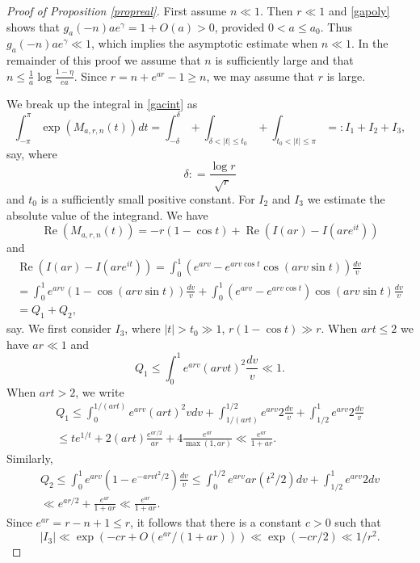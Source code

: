 \documentclass[11pt]{amsart}
\DeclareMathOperator{\re}{Re}
\begin{document}
\begin{proof}[Proof of Proposition \ref{propreal}]
First assume $n \ll 1$. Then $r\ll 1$ and \eqref{gapoly} shows that $g_a(-n) a e^\gamma = 1+O(a) >0$, provided $0<a\le a_0$. 
Thus $ g_a(-n) a e^\gamma \ll 1$, which implies the asymptotic estimate when $n\ll 1$. 
In the remainder of this proof we assume that $n$ is sufficiently large and that $n \le \frac{1}{a}\log \frac{1-\eta}{ea}$.
Since $r=n+e^{ar}-1 \ge n$, we may assume that $r$ is large. 

We break up the integral in \eqref{gacint} as 
$$
\int_{-\pi}^\pi  \exp\left(M_{a,r,n}(t)\right)dt = \int_{-\delta}^\delta + \int_{\delta<|t|\le t_0} +\int_{t_0<|t| \le \pi} =: I_1+I_2+I_3,
$$
say, where 
$$
\delta: =\frac{\log r }{\sqrt{r}}
$$
and $t_0$ is a sufficiently small positive constant. 
For $I_2$ and $I_3$ we estimate the absolute value of the integrand. We have
$$
\re(M_{a,r,n}(t)) = -r(1-\cos t ) + \re(I(ar)-I(ar e^{it}))
$$
and
\begin{multline*}
 \re(I(ar)-I(ar e^{it}))  = \int_0^1 (e^{arv}-e^{arv \cos t }\cos(arv \sin t) ) \frac{dv}{v} \\
 =  \int_0^1 e^{arv}(1-\cos(arv \sin t) ) \frac{dv}{v} +  \int_0^1 (e^{arv}-e^{arv \cos t })\cos(arv \sin t) \frac{dv}{v}\\
=Q_1+Q_2,
\end{multline*}
say. We first consider $I_3$, where $|t|>t_0 \gg 1$, $r(1-\cos t) \gg r$. When $art \le 2$ we have $ar\ll 1$ and 
$$
Q_1 \le \int_0^{1} e^{arv}( a r v  t)^2  \frac{dv}{v} \ll 1.
$$ 
When $art > 2$, we write
\begin{multline*}
Q_1 \le \int_0^{1/(ar t)} e^{arv}( a r  t)^2 v dv +  \int_{1/(ar t)}^{1/2} e^{arv} 2 \frac{dv}{v} + \int_{1/2}^1 e^{arv} 2 \frac{dv}{v}\\
\le t e^{1/t} + 2 (ar t) \frac{e^{ar/2}}{ar} + 4 \frac{e^{ar}}{\max(1,ar)}  \ll \frac{e^{ar}}{1+ar}.
\end{multline*}
Similarly,
\begin{multline*}
Q_2 \le \int_0^{1} e^{arv}( 1-e^{-arv t^2/2}) \frac{dv}{v}\le \int_0^{1/2} e^{arv} ar (t^2/2) dv +  \int_{1/2}^1  e^{arv} 2 dv \\
\ll e^{ar/2} + \frac{e^{ar}}{1+ar} \ll \frac{e^{ar}}{1+ar}.
\end{multline*}
Since $e^{ar}=r-n+1 \le r$, it follows that there is a constant $c>0$ such that 
$$
|I_3| \ll \exp( - c r + O( e^{ar}/(1+ar))) \ll \exp( - c r/2 ) \ll 1/r^2.
$$



\end{proof}
\end{document}
